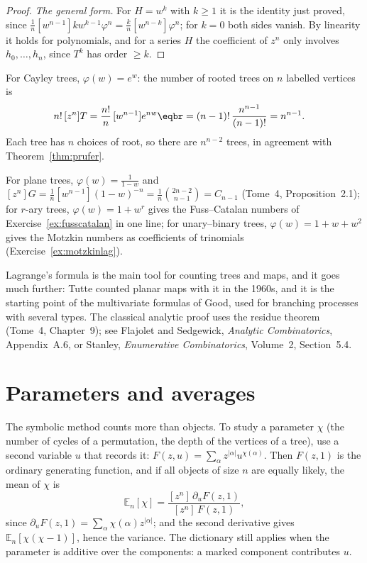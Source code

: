 \begin{proof}
\emph{The general form.} For $H=w^k$ with $k\ge1$ it is the identity just proved, since $\frac1n[w^{n-1}]kw^{k-1}\varphi^n=\frac kn[w^{n-k}]\varphi^n$; for $k=0$ both sides
vanish. By linearity it holds for polynomials, and for a series $H$ the coefficient of $z^n$ only involves $h_0,\dots,h_n$, since $T^k$ has order $\ge k$.
\end{proof}

\begin{example}\label{ex:cayleylagrange}
For Cayley trees, $\varphi(w)=e^w$: the number of rooted trees on $n$ labelled vertices is
\[
\begin{aligned}{}&n!\,[z^n]T=\frac{n!}n\,[w^{n-1}]e^{nw}\eqbr=(n-1)!\,\frac{n^{n-1}}{(n-1)!}=n^{n-1}.\end{aligned}
\]
Each tree has $n$ choices of root, so there are $n^{n-2}$ trees, in agreement with Theorem~\ref{thm:prufer}.
\end{example}

For plane trees, $\varphi(w)=\frac1{1-w}$ and $[z^n]G=\frac1n[w^{n-1}](1-w)^{-n}=\frac1n\binom{2n-2}{n-1}=C_{n-1}$ (Tome~4, Proposition~2.1); for $r$-ary trees, $\varphi(w)=1+w^r$ gives the
Fuss--Catalan numbers of Exercise~\ref{ex:fusscatalan} in one line; for unary--binary trees, $\varphi(w)=1+w+w^2$ gives the Motzkin numbers as
coefficients of trinomials (Exercise~\ref{ex:motzkinlag}).

\begin{remark}
Lagrange's formula is the main tool for counting trees and maps, and it goes much further: Tutte counted planar maps with it in
the 1960s, and it is the starting point of the multivariate formulas of Good, used for branching processes with several types.
The classical analytic proof uses the residue theorem (Tome~4, Chapter~9); see Flajolet and Sedgewick, \emph{Analytic Combinatorics},
Appendix~A.6, or Stanley, \emph{Enumerative Combinatorics}, Volume~2, Section~5.4.
\end{remark}

\section{Parameters and averages}

The symbolic method counts more than objects. To study a parameter $\chi$ (the number of cycles of a permutation, the depth of the
vertices of a tree), use a second variable $u$ that records it: $F(z,u)=\sum_\alpha z^{|\alpha|}u^{\chi(\alpha)}$. Then $F(z,1)$ is the ordinary generating function, and
if all objects of size $n$ are equally likely, the mean of $\chi$ is
\[
\mathbb E_n[\chi]=\frac{[z^n]\,\partial_uF(z,1)}{[z^n]\,F(z,1)},
\]
since $\partial_uF(z,1)=\sum_\alpha\chi(\alpha)z^{|\alpha|}$; and the second derivative gives $\mathbb E_n[\chi(\chi-1)]$, hence the variance. The dictionary still applies when the
parameter is additive over the components: a marked component contributes $u$.

